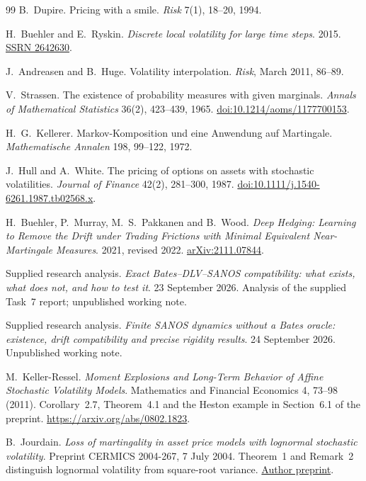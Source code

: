 \documentclass[11pt,a4paper]{article}
\numberwithin{equation}{section}
\theoremstyle{definition}\newtheorem{definition}[theorem]{Definition}
\theoremstyle{remark}\newtheorem{remark}[theorem]{Remark}
\begin{document}
\begin{thebibliography}{99}
B.~Dupire. Pricing with a smile. \emph{Risk} 7(1), 18--20, 1994.

H.~Buehler and E.~Ryskin. \emph{Discrete local volatility for large time steps}.
2015. \href{https://ssrn.com/abstract=2642630}{SSRN 2642630}.

J.~Andreasen and B.~Huge. Volatility interpolation. \emph{Risk}, March 2011, 86--89.

V.~Strassen. The existence of probability measures with given marginals.
\emph{Annals of Mathematical Statistics} 36(2), 423--439, 1965.
\href{https://doi.org/10.1214/aoms/1177700153}{doi:10.1214/aoms/1177700153}.

H.~G.~Kellerer. Markov-Komposition und eine Anwendung auf Martingale.
\emph{Mathematische Annalen} 198, 99--122, 1972.

J.~Hull and A.~White. The pricing of options on assets with stochastic volatilities.
\emph{Journal of Finance} 42(2), 281--300, 1987.
\href{https://doi.org/10.1111/j.1540-6261.1987.tb02568.x}{doi:10.1111/j.1540-6261.1987.tb02568.x}.

H.~Buehler, P.~Murray, M.~S.~Pakkanen and B.~Wood.
\emph{Deep Hedging: Learning to Remove the Drift under Trading Frictions with Minimal Equivalent Near-Martingale Measures}.
2021, revised 2022. \href{https://arxiv.org/abs/2111.07844}{arXiv:2111.07844}.

Supplied research analysis. \emph{Exact Bates--DLV--SANOS compatibility: what exists, what does not, and how to test it}. 23 September 2026. Analysis of the supplied Task~7 report; unpublished working note.

Supplied research analysis. \emph{Finite SANOS dynamics without a Bates oracle: existence, drift compatibility and precise rigidity results}. 24 September 2026. Unpublished working note.

M.~Keller-Ressel. \emph{Moment Explosions and Long-Term Behavior of Affine Stochastic Volatility Models}. Mathematics and Financial Economics 4, 73--98 (2011). Corollary~2.7, Theorem~4.1 and the Heston example in Section~6.1 of the preprint. \url{https://arxiv.org/abs/0802.1823}.

B.~Jourdain. \emph{Loss of martingality in asset price models with lognormal stochastic volatility}. Preprint CERMICS 2004-267, 7 July 2004. Theorem~1 and Remark~2 distinguish lognormal volatility from square-root variance. \href{https://cermics.enpc.fr/cermics-rapports-recherche/2004/CERMICS-2004/CERMICS-2004-267.pdf}{Author preprint}.


\end{thebibliography}
\end{document}
